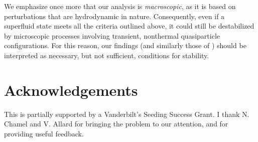 \documentclass[a4paper, amsfonts, amssymb, amsmath, reprint, showkeys, nofootinbib, twoside,notitlepage,onecolumn]{revtex4-2}
\theoremstyle{definition}
\theoremstyle{theorem}
\theoremstyle{corollary}
\begin{document}
{We emphasize once more that our analysis is \textit{macroscopic}, as it is based on perturbations that are hydrodynamic in nature. Consequently, even if a superfluid state meets all the criteria outlined above, it could still be destabilized by microscopic processes involving transient, nonthermal quasiparticle configurations. For this reason, our findings (and similarly those of \cite{Andreev2004}) should be interpreted as necessary, but not sufficient, conditions for stability.


}










\section*{Acknowledgements}

This is partially supported by a Vanderbilt's Seeding Success Grant. I thank N. Chamel and V. Allard for bringing the problem to our attention, and for providing useful feedback.
\end{document}
